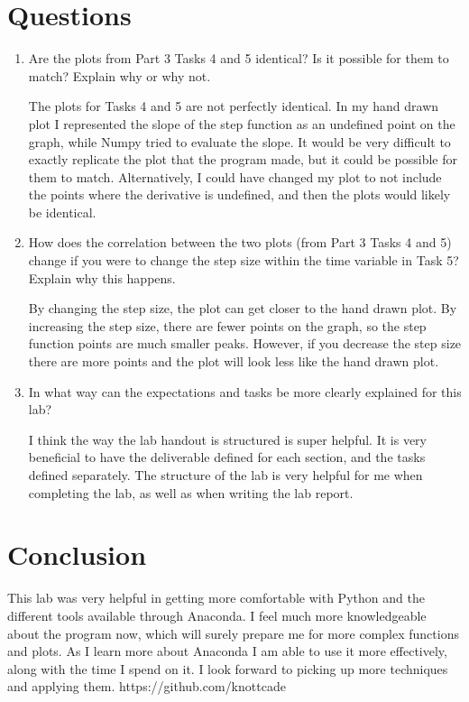 \documentclass[12pt]{report}
\begin{document}
{\newpage
\section{Questions}
\begin{enumerate}
    \item Are the plots from Part 3 Tasks 4 and 5 identical? Is it possible for them to match? Explain why or why not.
    
    The plots for Tasks 4 and 5 are not perfectly identical. In my hand drawn plot I represented the slope of the step function as an undefined point on the graph, while Numpy tried to evaluate the slope. It would be very difficult to exactly replicate the plot that the program made, but it could be possible for them to match. Alternatively, I could have changed my plot to not include the points where the derivative is undefined, and then the plots would likely be identical.
    \newline
    
    \item How does the correlation between the two plots (from Part 3 Tasks 4 and 5) change if you were to change the step size within the time variable in Task 5? Explain why this happens.
    
    By changing the step size, the plot can get closer to the hand drawn plot. By increasing the step size, there are fewer points on the graph, so the step function points are much smaller peaks. However, if you decrease the step size there are more points and the plot will look less like the hand drawn plot. 
    \newline
    
    \item In what way can the expectations and tasks be more clearly explained for this lab?
    
    I think the way the lab handout is structured is super helpful. It is very beneficial to have the deliverable defined for each section, and the tasks defined separately. The structure of the lab is very helpful for me when completing the lab, as well as when writing the lab report.
\end{enumerate}

\section{Conclusion}

This lab was very helpful in getting more comfortable with Python and the different tools available through Anaconda. I feel much more knowledgeable about the program now, which will surely prepare me for more complex functions and plots. As I learn more about Anaconda I am able to use it more effectively, along with the time I spend on it. I look forward to picking up more techniques and applying them.
https://github.com/knottcade


}
\end{document}
